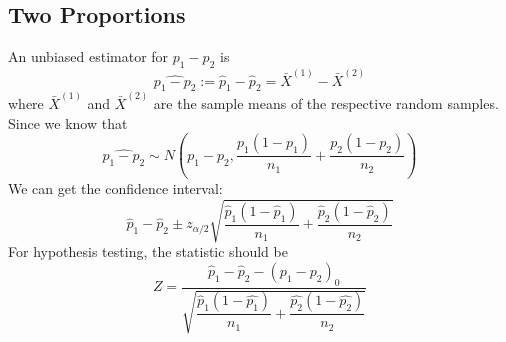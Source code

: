 \documentclass[a4paper,12pt]{article}
\begin{document}
\subsection{Two Proportions}
An unbiased estimator for $p_1-p_2$ is
$$
\widehat{p_1-p_2}:=\widehat{p}_1-\widehat{p}_2=\bar{X}^{(1)}-\bar{X}^{(2)}
$$
where $\bar{X}^{(1)}$ and $\bar{X}^{(2)}$ are the sample means of the respective random samples.\\
Since we know that 
$$
\widehat{p_1-p_2} \sim N\left(p_1-p_2, \frac{p_1\left(1-p_1\right)}{n_1}+\frac{p_2\left(1-p_2\right)}{n_2}\right)
$$
We can get the confidence interval:
\begin{equation}
    \widehat{p}_1-\widehat{p}_2 \pm z_{\alpha / 2} \sqrt{\frac{\widehat{p}_1\left(1-\widehat{p}_1\right)}{n_1}+\frac{\widehat{p}_2\left(1-\widehat{p}_2\right)}{n_2}}
    \end{equation}
For hypothesis testing, the statistic should be 
\begin{equation}
    Z=\frac{\widehat{p}_1-\widehat{p}_2-\left(p_1-p_2\right)_0}{\sqrt{\dfrac{\widehat{p}_1\left(1-\widehat{p_1}\right)}{n_1}+\dfrac{\widehat{p_2}\left(1-\widehat{p_2}\right)}{n_2}}}
    \end{equation}
\end{document}
